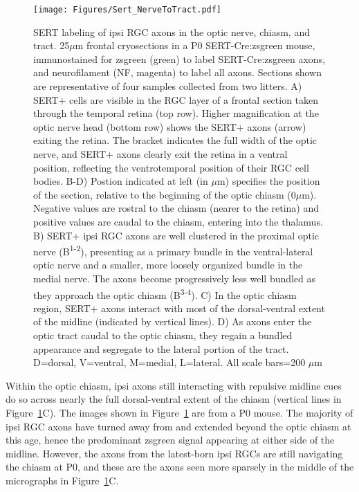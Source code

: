 \begin{figure}[hbtp]
    \begin{center}
        \texttt{[image: Figures/Sert\_NerveToTract.pdf]}
        \caption[SERT labeling of ipsi RGC axons in the optic nerve, chiasm, and tract.]
        {SERT labeling of ipsi RGC axons in the optic nerve, chiasm, and tract.
        25$\mu$m frontal cryosections in a P0 SERT-Cre:zsgreen mouse, immunostained for zsgreen (green) to label SERT-Cre:zsgreen axons, and neurofilament (NF, magenta) to label all axons.
        Sections shown are representative of four samples collected from two litters. %
        A) SERT+ cells are visible in the RGC layer of a frontal section taken through the temporal retina (top row).
        Higher magnification at the optic nerve head (bottom row) shows the SERT+ axons (arrow) exiting the retina.
        The bracket indicates the full width of the optic nerve, and SERT+ axons clearly exit the retina in a ventral position, reflecting the ventrotemporal position of their RGC cell bodies.
        B-D) Postion indicated at left (in $\mu$m) specifies the position of the section, relative to the beginning of the optic chiasm (0$\mu$m).
        Negative values are rostral to the chiasm (nearer to the retina) and positive values are caudal to the chiasm, entering into the thalamus.
        B) SERT+ ipsi RGC axons are well clustered in the proximal optic nerve (B\textsuperscript{1-2}), presenting as a primary bundle in the ventral-lateral optic nerve and a smaller, more loosely organized bundle in the medial nerve.
        The axons become progressively less well bundled as they approach the optic chiasm (B\textsuperscript{3-4}).
        C) In the optic chiasm region, SERT+ axons interact with most of the dorsal-ventral extent of the midline (indicated by vertical lines).
        D) As axons enter the optic tract caudal to the optic chiasm, they regain a bundled appearance and segregate to the lateral portion of the tract.
        D=dorsal, V=ventral, M=medial, L=lateral.
        All scale bars=200 $\mu$m}
        \label{Figures/Sert_NerveToTract}
    \end{center}
\end{figure}

Within the optic chiasm, ipsi axons still interacting with repulsive midline cues do so across nearly the full dorsal-ventral extent of the chiasm (vertical lines in Figure~\ref{Figures/Sert_NerveToTract}C).
The images shown in Figure~\ref{Figures/Sert_NerveToTract} are from a P0 mouse.
The majority of ipsi RGC axons have turned away from and extended beyond the optic chiasm at this age, hence the predominant zsgreen signal appearing at either side of the midline.
However, the axons from the latest-born ipsi RGCs are still navigating the chiasm at P0, and these are the axons seen more sparsely in the middle of the micrographs in Figure~\ref{Figures/Sert_NerveToTract}C.

